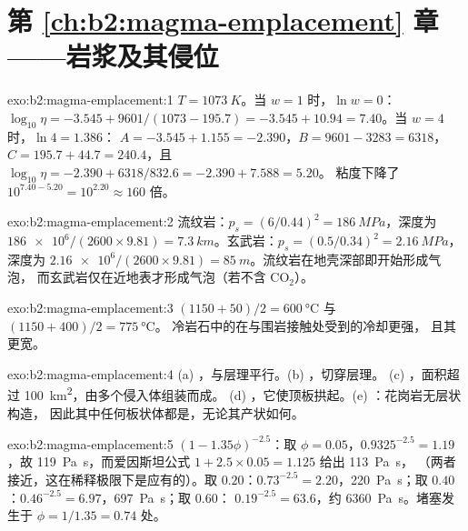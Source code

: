 \section*{第 \ref{ch:b2:magma-emplacement} 章——岩浆及其侵位}

\begin{solution}{exo:b2:magma-emplacement:1}
$T = \qty{1073}{K}$。当 $w = 1$ 时，$\ln w = 0$：$\log_{10}\eta = -3.545 +
9601/(1073 - 195.7) = -3.545 + 10.94 = 7.40$。当 $w = 4$ 时，$\ln 4 = 1.386$：
$A = -3.545 + 1.155 = -2.390$，$B = 9601 - 3283 = 6318$，$C = 195.7 + 44.7 =
240.4$，且 $\log_{10}\eta = -2.390 + 6318/832.6 = -2.390 + 7.588 = 5.20$。
粘度下降了 $10^{7.40 - 5.20} = 10^{2.20} \approx 160$ 倍。
\end{solution}

\begin{solution}{exo:b2:magma-emplacement:2}
流纹岩：$p_s = (6/0.44)^2 = \qty{186}{MPa}$，深度为 $\num{186e6}/(2600\times9.81)
= \qty{7.3}{km}$。玄武岩：$p_s = (0.5/0.34)^2 = \qty{2.16}{MPa}$，深度为
$\num{2.16e6}/(2600\times9.81) = \qty{85}{m}$。流纹岩在地壳深部即开始形成气泡，
而玄武岩仅在近地表才形成气泡（若不含 CO$_2$）。
\end{solution}

\begin{solution}{exo:b2:magma-emplacement:3}
$(1150 + 50)/2 = \qty{600}{\celsius}$ 与 $(1150 + 400)/2 = \qty{775}{\celsius}$。
冷岩石中的在与围岩接触处受到的冷却更强，
且其更宽。
\end{solution}

\begin{solution}{exo:b2:magma-emplacement:4}
(a) ，与层理平行。(b) ，切穿层理。
(c) ，面积超过 \qty{100}{km^2}，由多个侵入体组装而成。
(d) ，它使顶板拱起。(e) ：花岗岩无层状构造，
因此其中任何板状体都是，无论其产状如何。
\end{solution}

\begin{solution}{exo:b2:magma-emplacement:5}
$(1 - 1.35\phi)^{-2.5}$：取 $\phi = 0.05$，$0.9325^{-2.5} = 1.19$，故
\qty{119}{Pa.s}，而爱因斯坦公式 $1 + 2.5\times0.05 = 1.125$ 给出 \qty{113}{Pa.s}，
（两者接近，这在稀释极限下是应有的）。取 $0.20$：$0.73^{-2.5} =
2.20$，\qty{220}{Pa.s}；取 $0.40$：$0.46^{-2.5} = 6.97$，\qty{697}{Pa.s}；取 $0.60$：
$0.19^{-2.5} = 63.6$，约 \qty{6360}{Pa.s}。堵塞发生于 $\phi = 1/1.35 = 0.74$ 处。
\end{solution}

